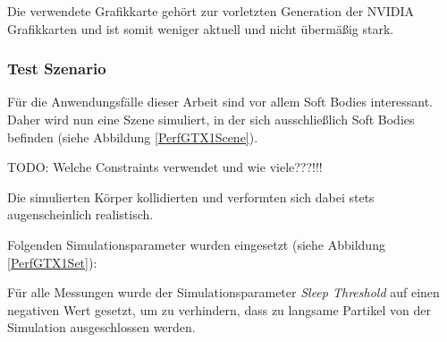 Die verwendete Grafikkarte gehört zur vorletzten Generation der NVIDIA Grafikkarten und ist somit weniger aktuell und nicht übermäßig stark.


\subsubsection{Test Szenario}

Für die Anwendungsfälle dieser Arbeit sind vor allem Soft Bodies interessant. Daher wird nun eine Szene simuliert, in der sich ausschließlich Soft Bodies befinden (siehe Abbildung \ref{PerfGTX1Scene}). 

TODO: Welche Constraints verwendet und wie viele???!!!


Die simulierten Körper kollidierten und verformten sich dabei stets augenscheinlich realistisch.

Folgenden Simulationsparameter wurden eingesetzt (siehe Abbildung \ref{PerfGTX1Set}):


Für alle Messungen wurde der Simulationsparameter \textit{Sleep Threshold} auf einen negativen Wert gesetzt, um zu verhindern, dass zu langsame Partikel von der Simulation ausgeschlossen werden.

